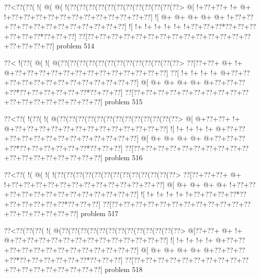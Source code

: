 \vbox{\vbox{\goo
\0??<\0??(\0??(\- !(\- @(\- @(\- !(\0??(\0??(\0??(\0??(\0??(\0??(\0??(\0??(\0??(\0??(\0??(\0??>
\- @[\- !+\0??+\0??+\- !+\- @+\- !+\0??+\0??+\0??+\0??+\0??+\0??+\0??+\0??+\0??+\0??+\0??+\0??]
\- ![\- @+\- @+\- @+\- @+\- @+\- !+\0??+\0??+\0??+\0??+\0??+\0??+\0??+\0??+\0??+\0??+\0??+\0??]
\- ![\- !+\- !+\- !+\- !+\- !+\- !+\0??+\0??+\0??*\0??+\0??+\0??+\0??+\0??+\0??*\0??+\0??+\0??]
\0??[\0??+\0??+\0??+\0??+\0??+\0??+\0??+\0??+\0??+\0??+\0??+\0??+\0??+\0??+\0??+\0??+\0??+\0??]
}
\hfil problem 514\hfil\break
}



\vbox{\vbox{\goo
\0??<\- !(\0??(\- @(\- !(\- @(\0??(\0??(\0??(\0??(\0??(\0??(\0??(\0??(\0??(\0??(\0??(\0??(\0??>
\0??[\0??+\0??+\- @+\- !+\- @+\0??+\0??+\0??+\0??+\0??+\0??+\0??+\0??+\0??+\0??+\0??+\0??+\0??]
\0??[\- !+\- !+\- !+\- !+\- @+\0??+\0??+\0??+\0??+\0??+\0??+\0??+\0??+\0??+\0??+\0??+\0??+\0??]
\- @[\- @+\- @+\- @+\- @+\- @+\0??+\0??+\0??+\0??*\0??+\0??+\0??+\0??+\0??+\0??*\0??+\0??+\0??]
\0??[\0??+\0??+\0??+\0??+\0??+\0??+\0??+\0??+\0??+\0??+\0??+\0??+\0??+\0??+\0??+\0??+\0??+\0??]
}
\hfil problem 515\hfil\break
}



\vbox{\vbox{\goo
\0??<\0??(\- !(\0??(\- !(\- @(\0??(\0??(\0??(\0??(\0??(\0??(\0??(\0??(\0??(\0??(\0??(\0??(\0??>
\- @[\- @+\0??+\0??+\- !+\- @+\0??+\0??+\0??+\0??+\0??+\0??+\0??+\0??+\0??+\0??+\0??+\0??+\0??]
\- ![\- !+\- !+\- !+\- !+\- @+\0??+\0??+\0??+\0??+\0??+\0??+\0??+\0??+\0??+\0??+\0??+\0??+\0??]
\- @[\- @+\- @+\- @+\- @+\- @+\0??+\0??+\0??+\0??*\0??+\0??+\0??+\0??+\0??+\0??*\0??+\0??+\0??]
\0??[\0??+\0??+\0??+\0??+\0??+\0??+\0??+\0??+\0??+\0??+\0??+\0??+\0??+\0??+\0??+\0??+\0??+\0??]
}
\hfil problem 516\hfil\break
}



\vbox{\vbox{\goo
\0??<\0??(\- !(\- @(\- !(\- !(\0??(\0??(\0??(\0??(\0??(\0??(\0??(\0??(\0??(\0??(\0??(\0??(\0??>
\0??[\0??+\0??+\0??+\- @+\- !+\0??+\0??+\0??+\0??+\0??+\0??+\0??+\0??+\0??+\0??+\0??+\0??+\0??]
\- @[\- @+\- @+\- @+\- @+\- !+\0??+\0??+\0??+\0??+\0??+\0??+\0??+\0??+\0??+\0??+\0??+\0??+\0??]
\- ![\- !+\- !+\- !+\- !+\- !+\0??+\0??+\0??+\0??*\0??+\0??+\0??+\0??+\0??+\0??*\0??+\0??+\0??]
\0??[\0??+\0??+\0??+\0??+\0??+\0??+\0??+\0??+\0??+\0??+\0??+\0??+\0??+\0??+\0??+\0??+\0??+\0??]
}
\hfil problem 517\hfil\break
}



\vbox{\vbox{\goo
\0??<\0??(\0??(\0??(\- !(\- @(\0??(\0??(\0??(\0??(\0??(\0??(\0??(\0??(\0??(\0??(\0??(\0??(\0??>
\- @[\0??+\0??+\- @+\- !+\- @+\0??+\0??+\0??+\0??+\0??+\0??+\0??+\0??+\0??+\0??+\0??+\0??+\0??]
\- ![\- !+\- !+\- !+\- !+\- @+\0??+\0??+\0??+\0??+\0??+\0??+\0??+\0??+\0??+\0??+\0??+\0??+\0??]
\- @[\- @+\- @+\- @+\- @+\- @+\0??+\0??+\0??+\0??*\0??+\0??+\0??+\0??+\0??+\0??*\0??+\0??+\0??]
\0??[\0??+\0??+\0??+\0??+\0??+\0??+\0??+\0??+\0??+\0??+\0??+\0??+\0??+\0??+\0??+\0??+\0??+\0??]
}
\hfil problem 518\hfil\break
}



